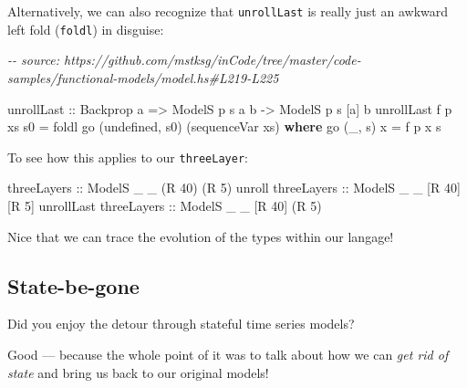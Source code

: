 \documentclass[]{article}
\newenvironment{Shaded}{}{}
\newcommand{\CommentTok}[1]{\textcolor[rgb]{0.38,0.63,0.69}{\textit{#1}}}
\newcommand{\DataTypeTok}[1]{\textcolor[rgb]{0.56,0.13,0.00}{#1}}
\newcommand{\DecValTok}[1]{\textcolor[rgb]{0.25,0.63,0.44}{#1}}
\newcommand{\FunctionTok}[1]{\textcolor[rgb]{0.02,0.16,0.49}{#1}}
\newcommand{\KeywordTok}[1]{\textcolor[rgb]{0.00,0.44,0.13}{\textbf{#1}}}
\newcommand{\NormalTok}[1]{#1}
\newcommand{\OtherTok}[1]{\textcolor[rgb]{0.00,0.44,0.13}{#1}}
\begin{document}
Alternatively, we can also recognize that \texttt{unrollLast} is really just an
awkward left fold (\texttt{foldl}) in disguise:

\begin{Shaded}
\begin{Highlighting}[]
\CommentTok{{-}{-} source: https://github.com/mstksg/inCode/tree/master/code{-}samples/functional{-}models/model.hs\#L219{-}L225}

\NormalTok{unrollLast\textquotesingle{}}
\OtherTok{    ::} \DataTypeTok{Backprop}\NormalTok{ a}
    \OtherTok{=\textgreater{}} \DataTypeTok{ModelS}\NormalTok{ p s  a  b}
    \OtherTok{{-}\textgreater{}} \DataTypeTok{ModelS}\NormalTok{ p s [a] b}
\NormalTok{unrollLast\textquotesingle{} f p xs s0 }\OtherTok{=}\NormalTok{ foldl\textquotesingle{} go (}\FunctionTok{undefined}\NormalTok{, s0) (sequenceVar xs)}
  \KeywordTok{where}
\NormalTok{    go (\_, s) x }\OtherTok{=}\NormalTok{ f p x s}
\end{Highlighting}
\end{Shaded}

To see how this applies to our \texttt{threeLayer}:

\begin{Shaded}
\begin{Highlighting}[]
\OtherTok{threeLayers            ::} \DataTypeTok{ModelS}\NormalTok{ \_ \_ (}\DataTypeTok{R} \DecValTok{40}\NormalTok{) (}\DataTypeTok{R} \DecValTok{5}\NormalTok{)}
\NormalTok{unroll}\OtherTok{     threeLayers ::} \DataTypeTok{ModelS}\NormalTok{ \_ \_ [}\DataTypeTok{R} \DecValTok{40}\NormalTok{] [}\DataTypeTok{R} \DecValTok{5}\NormalTok{]}
\NormalTok{unrollLast}\OtherTok{ threeLayers ::} \DataTypeTok{ModelS}\NormalTok{ \_ \_ [}\DataTypeTok{R} \DecValTok{40}\NormalTok{] (}\DataTypeTok{R} \DecValTok{5}\NormalTok{)}
\end{Highlighting}
\end{Shaded}

Nice that we can trace the evolution of the types within our langage!

\subsection{State-be-gone}\label{state-be-gone}

Did you enjoy the detour through stateful time series models?

Good --- because the whole point of it was to talk about how we can \emph{get
rid of state} and bring us back to our original models!
\end{document}
